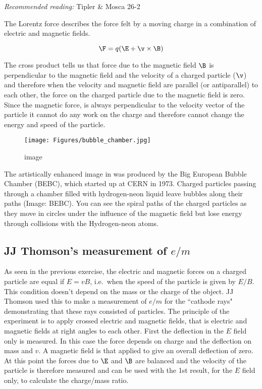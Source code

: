 \documentclass[
]{book}
\theoremstyle{definition}
\theoremstyle{definition}
\theoremstyle{definition}
\theoremstyle{definition}
\theoremstyle{remark}
\begin{document}
\emph{Recommended reading:} Tipler \& Mosca 26-2

The Lorentz force describes the force felt by a moving charge in a
combination of electric and magnetic fields.

\[\F = q(\E + \v \times \B)\]

The cross product tells us that force due to the magnetic field \(\B\) is
perpendicular to the magnetic field and the velocity of a charged
particle (\(\v\)) and therefore when the velocity and magnetic field are
parallel (or antiparallel) to each other, the force on the charged
particle due to the magnetic field is zero. Since the magnetic force, is
always perpendicular to the velocity vector of the particle it cannot do
any work on the charge and therefore cannot change the energy and speed
of the particle.

\begin{figure}
\centering
\texttt{[image: Figures/bubble\_chamber.jpg]}
\caption{image}
\end{figure}

The artistically enhanced image in was produced by the Big European
Bubble Chamber (BEBC), which started up at CERN in 1973. Charged
particles passing through a chamber filled with hydrogen-neon liquid
leave bubbles along their paths (Image: BEBC). You can see the spiral
paths of the charged particles as they move in circles under the
influence of the magnetic field but lose energy through collisions with
the Hydrogen-neon atoms.

\hypertarget{jj-thomsons-measurement-of-em}{%
\subsection{\texorpdfstring{JJ Thomson's measurement of \(e/m\)}{JJ Thomson's measurement of e/m}}\label{jj-thomsons-measurement-of-em}}

As seen in the previous exercise, the electric and magnetic forces on a
charged particle are equal if \(E = vB\), i.e.~when the speed of the
particle is given by \(E/B\). This condition doesn't depend on the mass or
the charge of the object. JJ Thomson used this to make a measurement of
\(e/m\) for the ``cathode rays" demonstrating that these rays consisted of
particles. The principle of the experiment is to apply crossed electric
and magnetic fields, that is electric and magnetic fields at right
angles to each other. First the deflection in the \(E\) field only is
measured. In this case the force depends on charge and the deflection on
mass and \(v\). A magnetic field is that applied to give an overall
deflection of zero. At this point the forces due to \(\E\) and \(\B\) are
balanced and the velocity of the particle is therefore measured and can
be used with the 1st result, for the \(E\) field only, to calculate the
charge/mass ratio.
\end{document}
